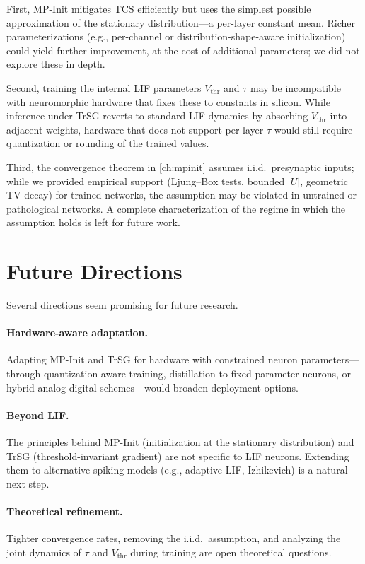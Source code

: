 First, MP-Init mitigates TCS efficiently but uses the simplest possible approximation of the stationary distribution—a per-layer constant mean. Richer parameterizations (e.g., per-channel or distribution-shape-aware initialization) could yield further improvement, at the cost of additional parameters; we did not explore these in depth.

Second, training the internal LIF parameters $V_{\text{thr}}$ and $\tau$ may be incompatible with neuromorphic hardware that fixes these to constants in silicon. While inference under TrSG reverts to standard LIF dynamics by absorbing $V_{\text{thr}}$ into adjacent weights, hardware that does not support per-layer $\tau$ would still require quantization or rounding of the trained values.

Third, the convergence theorem in \cref{ch:mpinit} assumes i.i.d.\ presynaptic inputs; while we provided empirical support (Ljung--Box tests, bounded $|U|$, geometric TV decay) for trained networks, the assumption may be violated in untrained or pathological networks. A complete characterization of the regime in which the assumption holds is left for future work.

\section{Future Directions}
\label{sec:conclusion_future}

Several directions seem promising for future research.

\paragraph{Hardware-aware adaptation.}
Adapting MP-Init and TrSG for hardware with constrained neuron parameters—through quantization-aware training, distillation to fixed-parameter neurons, or hybrid analog-digital schemes—would broaden deployment options.

\paragraph{Beyond LIF.}
The principles behind MP-Init (initialization at the stationary distribution) and TrSG (threshold-invariant gradient) are not specific to LIF neurons. Extending them to alternative spiking models (e.g., adaptive LIF, Izhikevich) is a natural next step.

\paragraph{Theoretical refinement.}
Tighter convergence rates, removing the i.i.d.\ assumption, and analyzing the joint dynamics of $\tau$ and $V_{\text{thr}}$ during training are open theoretical questions.

